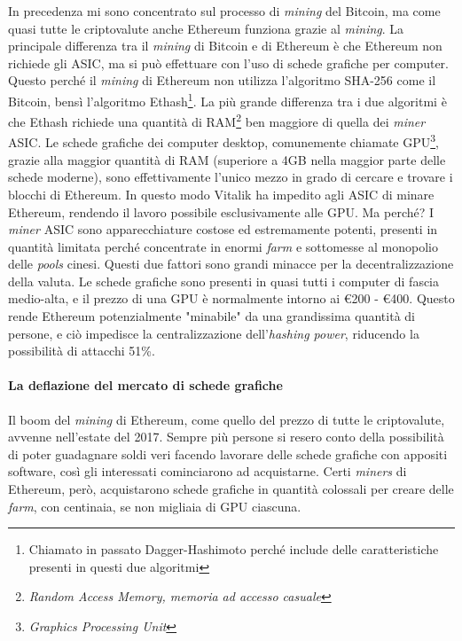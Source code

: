 \documentclass {article}
\begin{document}
In precedenza mi sono concentrato sul processo di \textit{mining} del Bitcoin, ma come quasi tutte le criptovalute anche Ethereum funziona grazie al \textit{mining}.
La principale differenza tra il \textit{mining} di Bitcoin e di Ethereum è che Ethereum non richiede gli ASIC, ma si può effettuare con l'uso di schede grafiche per computer.
Questo perché il \textit{mining} di Ethereum non utilizza l'algoritmo SHA-256 come il Bitcoin, bensì l'algoritmo Ethash\footnote{Chiamato in passato Dagger-Hashimoto perché include delle caratteristiche presenti in questi due algoritmi}.
La più grande differenza tra i due algoritmi è che Ethash richiede una quantità di RAM\footnote{\textit{Random Access Memory, memoria ad accesso casuale}} ben maggiore di quella dei \textit{miner} ASIC.
Le schede grafiche dei computer desktop, comunemente chiamate GPU\footnote{\textit{Graphics Processing Unit}}, grazie alla maggior quantità di RAM (superiore a 4GB nella maggior parte delle schede moderne), sono effettivamente l'unico mezzo in grado di cercare e trovare i blocchi di Ethereum.
In questo modo Vitalik ha impedito agli ASIC di minare Ethereum, rendendo il lavoro possibile esclusivamente alle GPU. Ma perché?
I \textit{miner} ASIC sono apparecchiature costose ed estremamente potenti, presenti in quantità limitata perché concentrate in enormi \textit{farm} e sottomesse al monopolio delle \textit{pools} cinesi.
Questi due fattori sono grandi minacce per la decentralizzazione della valuta.
Le schede grafiche sono presenti in quasi tutti i computer di fascia medio-alta, e il prezzo di una GPU è normalmente intorno ai \euro{200} - \euro{400}.
Questo rende Ethereum potenzialmente "minabile" da una grandissima quantità di persone, e ciò impedisce la centralizzazione dell'\textit{hashing power}, riducendo la possibilità di attacchi 51\%.

\paragraph {La deflazione del mercato di schede grafiche}

Il boom del \textit{mining} di Ethereum, come quello del prezzo di tutte le criptovalute, avvenne nell'estate del 2017.
Sempre più persone si resero conto della possibilità di poter guadagnare soldi veri facendo lavorare delle schede grafiche con appositi software, così gli interessati cominciarono ad acquistarne.
Certi \textit{miners} di Ethereum, però, acquistarono schede grafiche in quantità colossali per creare delle \textit{farm}, con centinaia, se non migliaia di GPU ciascuna.
\end{document}
